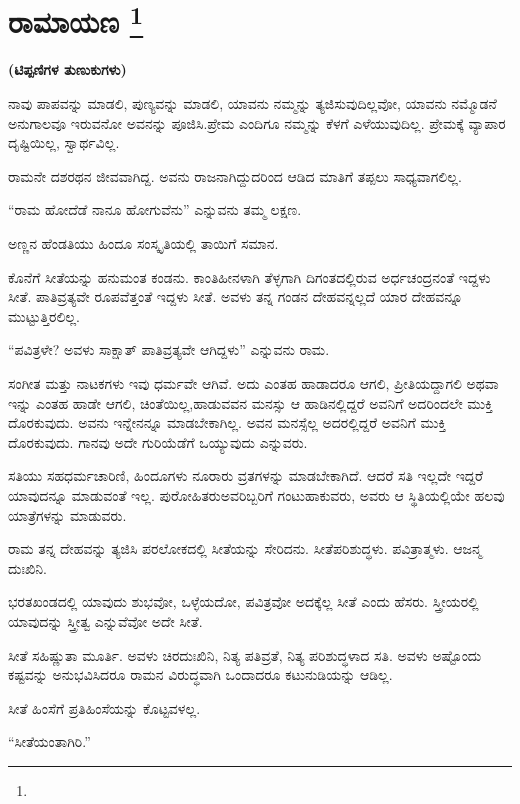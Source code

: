 
\chapter[ರಾಮಾಯಣ ]{ರಾಮಾಯಣ \protect\footnote{}}

\centerline{\textbf{(ಟಿಪ್ಪಣಿಗಳ ತುಣುಕುಗಳು)}}

ನಾವು ಪಾಪವನ್ನು ಮಾಡಲಿ, ಪುಣ್ಯವನ್ನು ಮಾಡಲಿ, ಯಾವನು ನಮ್ಮನ್ನು ತ್ಯಜಿಸುವುದಿಲ್ಲವೋ, ಯಾವನು ನಮ್ಮೊಡನೆ ಅನುಗಾಲವೂ ಇರುವನೋ ಅವನನ್ನು ಪೂಜಿಸಿ.\break ಪ್ರೇಮ ಎಂದಿಗೂ ನಮ್ಮನ್ನು ಕೆಳಗೆ ಎಳೆಯುವುದಿಲ್ಲ. ಪ್ರೇಮಕ್ಕೆ ವ್ಯಾಪಾರ ದೃಷ್ಟಿಯಿಲ್ಲ, ಸ್ವಾರ್ಥವಿಲ್ಲ.

ರಾಮನೇ ದಶರಥನ ಜೀವವಾಗಿದ್ದ. ಅವನು ರಾಜನಾಗಿದ್ದುದರಿಂದ ಆಡಿದ ಮಾತಿಗೆ ತಪ್ಪಲು ಸಾಧ್ಯವಾಗಲಿಲ್ಲ.

“ರಾಮ ಹೋದೆಡೆ ನಾನೂ ಹೋಗುವೆನು” ಎನ್ನುವನು ತಮ್ಮ ಲಕ್ಷಣ.

ಅಣ್ಣನ ಹೆಂಡತಿಯು ಹಿಂದೂ ಸಂಸ್ಕೃತಿಯಲ್ಲಿ ತಾಯಿಗೆ ಸಮಾನ.

ಕೊನೆಗೆ ಸೀತೆಯನ್ನು ಹನುಮಂತ ಕಂಡನು. ಕಾಂತಿಹೀನಳಾಗಿ ತೆಳ್ಳಗಾಗಿ ದಿಗಂತದಲ್ಲಿರುವ ಅರ್ಧಚಂದ್ರನಂತೆ ಇದ್ದಳು ಸೀತೆ. ಪಾತಿವ್ರತ್ಯವೇ ರೂಪವೆತ್ತಂತೆ ಇದ್ದಳು ಸೀತೆ. ಅವಳು ತನ್ನ ಗಂಡನ ದೇಹವನ್ನಲ್ಲದೆ ಯಾರ ದೇಹವನ್ನೂ ಮುಟ್ಟುತ್ತಿರಲಿಲ್ಲ.

“ಪವಿತ್ರಳೇ? ಅವಳು ಸಾಕ್ಷಾತ್​ ಪಾತಿವ್ರತ್ಯವೇ ಆಗಿದ್ದಳು” ಎನ್ನುವನು ರಾಮ.

ಸಂಗೀತ ಮತ್ತು ನಾಟಕಗಳು ಇವು ಧರ್ಮವೇ ಆಗಿವೆ. ಅದು ಎಂತಹ ಹಾಡಾದರೂ ಆಗಲಿ, ಪ್ರೀತಿಯದ್ದಾಗಲಿ ಅಥವಾ ಇನ್ನು ಎಂತಹ ಹಾಡೇ ಆಗಲಿ, ಚಿಂತೆಯಿಲ್ಲ,\break ಹಾಡುವವನ ಮನಸ್ಸು ಆ ಹಾಡಿನಲ್ಲಿದ್ದರೆ ಅವನಿಗೆ ಅದರಿಂದಲೇ ಮುಕ್ತಿ ದೊರಕುವುದು. ಅವನು ಇನ್ನೇನನ್ನೂ ಮಾಡಬೇಕಾಗಿಲ್ಲ. ಅವನ ಮನಸ್ಸೆಲ್ಲ ಅದರಲ್ಲಿದ್ದರೆ ಅವನಿಗೆ ಮುಕ್ತಿ ದೊರಕುವುದು. ಗಾನವು ಅದೇ ಗುರಿಯೆಡೆಗೆ ಒಯ್ಯುವುದು ಎನ್ನುವರು.

ಸತಿಯು ಸಹಧರ್ಮಚಾರಿಣಿ, ಹಿಂದೂಗಳು ನೂರಾರು ವ್ರತಗಳನ್ನು ಮಾಡಬೇಕಾಗಿದೆ. ಆದರೆ ಸತಿ ಇಲ್ಲದೇ ಇದ್ದರೆ ಯಾವುದನ್ನೂ ಮಾಡುವಂತೆ ಇಲ್ಲ. ಪುರೋಹಿತರು\break ಅವರಿಬ್ಬರಿಗೆ ಗಂಟುಹಾಕುವರು, ಅವರು ಆ ಸ್ಥಿತಿಯಲ್ಲಿಯೇ ಹಲವು ಯಾತ್ರೆಗಳನ್ನು ಮಾಡುವರು.

ರಾಮ ತನ್ನ ದೇಹವನ್ನು ತ್ಯಜಿಸಿ ಪರಲೋಕದಲ್ಲಿ ಸೀತೆಯನ್ನು ಸೇರಿದನು. ಸೀತೆ\break ಪರಿಶುದ್ಧಳು. ಪವಿತ್ರಾತ್ಮಳು. ಆಜನ್ಮ ದುಃಖಿನಿ.

ಭರತಖಂಡದಲ್ಲಿ ಯಾವುದು ಶುಭವೋ, ಒಳ್ಳೆಯದೋ, ಪವಿತ್ರವೋ ಅದಕ್ಕೆಲ್ಲ ಸೀತೆ ಎಂದು ಹೆಸರು. ಸ್ತ್ರೀಯರಲ್ಲಿ ಯಾವುದನ್ನು ಸ್ತ್ರೀತ್ವ ಎನ್ನುವೆವೋ ಅದೇ ಸೀತೆ.

ಸೀತೆ ಸಹಿಷ್ಣುತಾ ಮೂರ್ತಿ. ಅವಳು ಚಿರದುಃಖಿನಿ, ನಿತ್ಯ ಪತಿವ್ರತೆ, ನಿತ್ಯ ಪರಿಶುದ್ಧಳಾದ ಸತಿ. ಅವಳು ಅಷ್ಟೊಂದು ಕಷ್ಟವನ್ನು ಅನುಭವಿಸಿದರೂ ರಾಮನ ವಿರುದ್ಧವಾಗಿ ಒಂದಾದರೂ ಕಟುನುಡಿಯನ್ನು ಆಡಿಲ್ಲ.

ಸೀತೆ ಹಿಂಸೆಗೆ ಪ್ರತಿಹಿಂಸೆಯನ್ನು ಕೊಟ್ಟವಳಲ್ಲ.

“ಸೀತೆಯಂತಾಗಿರಿ.”

\vskip -0.5cm

